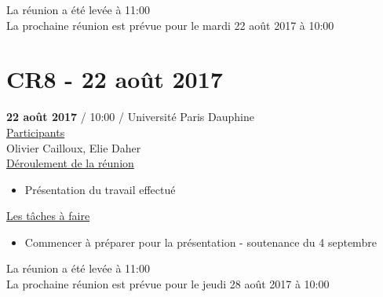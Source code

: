 \documentclass{report}
\begin{document}
\begin{appendices}
La réunion a été levée à 11:00\\

La prochaine réunion est prévue pour le mardi 22 août 2017 à 10:00
\newpage
\section{CR8 - 22 août 2017}
\textbf{22 août 2017} / 10:00 / Université Paris Dauphine \\

\underline{Participants} \\

Olivier Cailloux, Elie Daher\\

\underline{Déroulement de la réunion} \\
\begin{itemize}
	\item Présentation du travail effectué\\
\end{itemize}

\underline{Les tâches à faire} \\
\begin{itemize}
	\item Commencer à préparer pour la présentation - soutenance du 4 septembre\\
\end{itemize}

La réunion a été levée à 11:00\\

La prochaine réunion est prévue pour le jeudi 28 août 2017 à 10:00




\end{appendices}
\end{document}
